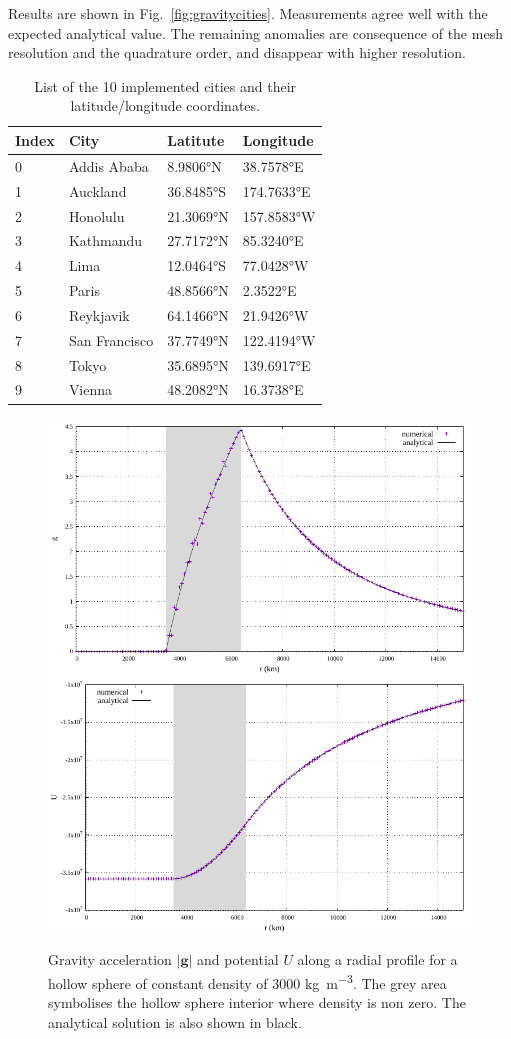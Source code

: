 Results are shown in Fig.~\ref{fig:gravitycities}. Measurements agree well with the expected analytical value. The remaining anomalies are consequence of the mesh resolution and the quadrature order, and disappear with higher resolution.
  
\begin{table}
\centering
\begin{tabular}{llll}
\hline
Index & City & Latitute & Longitude \\
\hline\hline
 0 & Addis Ababa &8.9806\si{\degree}N & 38.7578\si{\degree}E \\
 1 & Auckland & 36.8485\si{\degree}S & 174.7633\si{\degree}E \\
 2 & Honolulu &21.3069\si{\degree}N & 157.8583\si{\degree}W \\
 3 & Kathmandu &27.7172\si{\degree}N & 85.3240\si{\degree}E \\
 4 & Lima &12.0464\si{\degree}S & 77.0428\si{\degree}W \\
 5 & Paris & 48.8566\si{\degree}N & 2.3522\si{\degree}E \\
 6 & Reykjavik & 64.1466\si{\degree}N & 21.9426\si{\degree}W \\
 7 & San Francisco & 37.7749\si{\degree}N & 122.4194\si{\degree}W \\ 
 8 & Tokyo & 35.6895\si{\degree}N & 139.6917\si{\degree}E \\
 9 & Vienna &48.2082\si{\degree}N & 16.3738\si{\degree}E \\
\hline
\end{tabular}
\caption{List of the 10 implemented cities and their latitude/longitude coordinates.}
\label{tab:cities}
\end{table}

\begin{figure}[h!]
\centering
\includegraphics[width=0.48\linewidth]{../../benchmarks/gravity_prem/doc/profile_gravity_const_g.pdf}
\includegraphics[width=0.48\linewidth]{../../benchmarks/gravity_prem/doc/profile_gravity_const_U.pdf}
\caption{Gravity acceleration $|{\mathbf g}|$ and potential $U$ along a radial profile for a hollow sphere of constant density of 3000 \si{\kilogram\per\cubic\metre}. The grey area symbolises the hollow sphere interior where density is non zero. The analytical solution is also shown in black.}
\label{fig:gravityline}
\end{figure}


